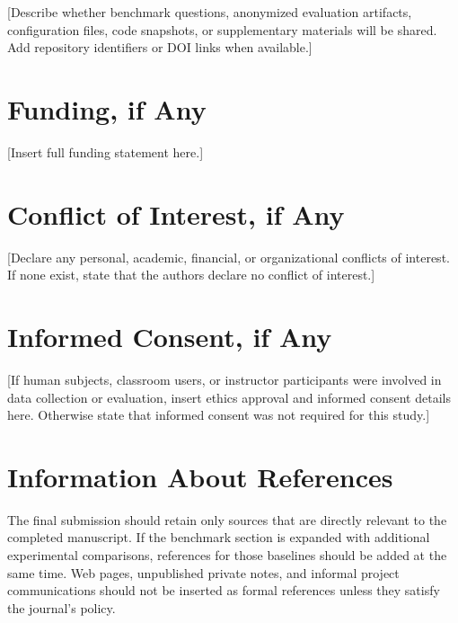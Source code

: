 \documentclass[11pt,a4paper]{article}
\begin{document}
[Describe whether benchmark questions, anonymized evaluation artifacts, configuration files, code snapshots, or supplementary materials will be shared. Add repository identifiers or DOI links when available.]

\section*{Funding, if Any}

[Insert full funding statement here.]

\section*{Conflict of Interest, if Any}

[Declare any personal, academic, financial, or organizational conflicts of interest. If none exist, state that the authors declare no conflict of interest.]

\section*{Informed Consent, if Any}

[If human subjects, classroom users, or instructor participants were involved in data collection or evaluation, insert ethics approval and informed consent details here. Otherwise state that informed consent was not required for this study.]

\section{Information About References}

The final submission should retain only sources that are directly relevant to the completed manuscript. If the benchmark section is expanded with additional experimental comparisons, references for those baselines should be added at the same time. Web pages, unpublished private notes, and informal project communications should not be inserted as formal references unless they satisfy the journal's policy.
\end{document}
